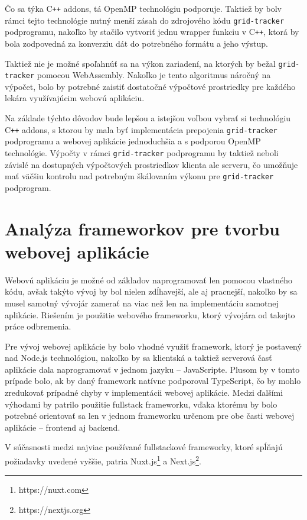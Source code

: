 Čo sa týka C\texttt{++} addons, tá OpenMP technológiu podporuje. Taktiež by bol\newline v rámci tejto technológie nutný menší zásah do zdrojového kódu \texttt{grid-tracker} podprogramu, nakoľko by stačilo vytvoriť jednu wrapper funkciu v C\texttt{++}, ktorá by bola zodpovedná za konverziu dát do potrebného formátu a jeho výstup.

\clearpage

Taktiež nie je možné spoľahnúť sa na výkon zariadení, na ktorých by bežal \texttt{grid-tracker} pomocou WebAssembly. Nakoľko je tento algoritmus náročný na výpočet, bolo by potrebné zaistiť dostatočné výpočtové prostriedky pre každého lekára využívajúcim webovú aplikáciu.

Na základe týchto dôvodov bude lepšou a istejšou voľbou vybrať si technológiu C\texttt{++} addons, s ktorou by mala byť implementácia prepojenia \texttt{grid-tracker} podprogramu a webovej aplikácie jednoduchšia a s podporou OpenMP technológie. Výpočty v rámci \texttt{grid-tracker} podprogramu by taktiež neboli závislé na dostupných výpočtových prostriedkov klienta ale serveru, čo umožňuje mať väčšiu kontrolu nad potrebným škálovaním výkonu pre \texttt{grid-tracker} podprogram.

\section {Analýza frameworkov pre tvorbu webovej aplikácie}
Webovú aplikáciu je možné od základov naprogramovať len pomocou vlastného kódu, avšak takýto vývoj by bol nielen zdĺhavejší, ale aj pracnejší, nakoľko by sa musel samotný vývojár zamerať na viac než len na implementáciu samotnej aplikácie. Riešením je použitie webového frameworku, ktorý vývojára od takejto práce odbremenia. 

Pre vývoj webovej aplikácie by bolo vhodné využiť framework, ktorý je postavený nad Node.js technológiou, nakoľko by sa klientská a taktiež serverová časť aplikácie dala naprogramovať v jednom jazyku -- JavaScripte. Plusom by v tomto prípade bolo, ak by daný framework natívne podporoval TypeScript, čo by mohlo zredukovať prípadné chyby v implementácii webovej aplikácie.
Medzi ďalšími výhodami by patrilo použitie fullstack frameworku, vďaka ktorému by bolo potrebné orientovať sa len v jednom frameworku určenom pre obe časti webovej aplikácie -- frontend aj backend.

V súčasnosti medzi najviac používané fullstackové frameworky, ktoré \newline spĺňajú požiadavky uvedené vyššie, patria Nuxt.js\footnote{https://nuxt.com} a Next.js\footnote{https://nextjs.org}.

